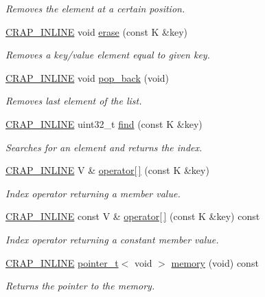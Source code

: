 \begin{DoxyCompactItemize}
\begin{DoxyCompactList}\small\item\em Removes the element at a certain position. \end{DoxyCompactList}\item 
\hyperlink{config__x86_8h_a5a40526b8d842e7ff731509998bb0f1c}{C\+R\+A\+P\+\_\+\+I\+N\+L\+I\+N\+E} void \hyperlink{classcrap_1_1sorted__array__map_a5cbb49c95476afcf6edfc91487f8cc4a}{erase} (const K \&key)
\begin{DoxyCompactList}\small\item\em Removes a key/value element equal to given key. \end{DoxyCompactList}\item 
\hyperlink{config__x86_8h_a5a40526b8d842e7ff731509998bb0f1c}{C\+R\+A\+P\+\_\+\+I\+N\+L\+I\+N\+E} void \hyperlink{classcrap_1_1sorted__array__map_af6dec9f742421813fef0b89b93a61fc3}{pop\+\_\+back} (void)
\begin{DoxyCompactList}\small\item\em Removes last element of the list. \end{DoxyCompactList}\item 
\hyperlink{config__x86_8h_a5a40526b8d842e7ff731509998bb0f1c}{C\+R\+A\+P\+\_\+\+I\+N\+L\+I\+N\+E} uint32\+\_\+t \hyperlink{classcrap_1_1sorted__array__map_ac5d0c7ce88e75f5fc75247f96c0ad035}{find} (const K \&key)
\begin{DoxyCompactList}\small\item\em Searches for an element and returns the index. \end{DoxyCompactList}\item 
\hyperlink{config__x86_8h_a5a40526b8d842e7ff731509998bb0f1c}{C\+R\+A\+P\+\_\+\+I\+N\+L\+I\+N\+E} V \& \hyperlink{classcrap_1_1sorted__array__map_ac516d494de678305cce0bf62047bee8d}{operator\mbox{[}$\,$\mbox{]}} (const K \&key)
\begin{DoxyCompactList}\small\item\em Index operator returning a member value. \end{DoxyCompactList}\item 
\hyperlink{config__x86_8h_a5a40526b8d842e7ff731509998bb0f1c}{C\+R\+A\+P\+\_\+\+I\+N\+L\+I\+N\+E} const V \& \hyperlink{classcrap_1_1sorted__array__map_ab2a60a56d6b4b07419f2a84fef1b575d}{operator\mbox{[}$\,$\mbox{]}} (const K \&key) const 
\begin{DoxyCompactList}\small\item\em Index operator returning a constant member value. \end{DoxyCompactList}\item 
\hyperlink{config__x86_8h_a5a40526b8d842e7ff731509998bb0f1c}{C\+R\+A\+P\+\_\+\+I\+N\+L\+I\+N\+E} \hyperlink{structcrap_1_1pointer__t}{pointer\+\_\+t}$<$ void $>$ \hyperlink{classcrap_1_1sorted__array__map_a2928eed1a0995dfa795ce12e29180af6}{memory} (void) const 
\begin{DoxyCompactList}\small\item\em Returns the pointer to the memory. \end{DoxyCompactList}\end{DoxyCompactItemize}
